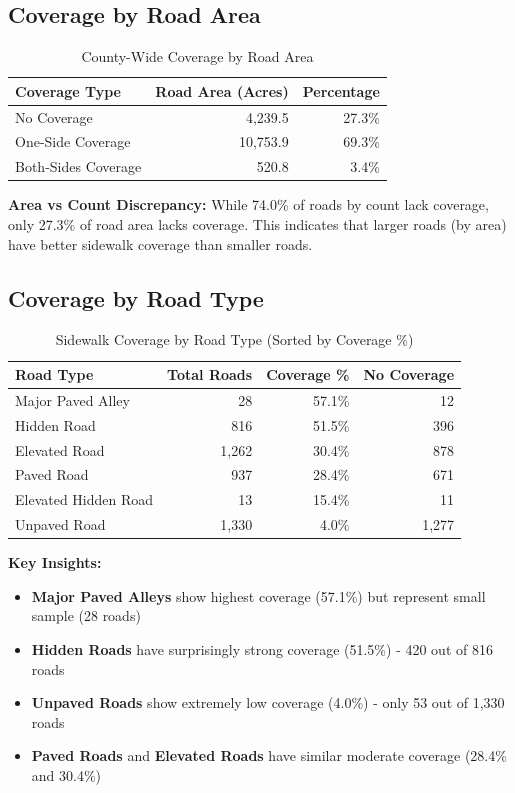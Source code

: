 \documentclass[11pt,letterpaper]{article}
\begin{document}
\subsection{Coverage by Road Area}

\begin{table}[H]
\centering
\begin{tabular}{@{}lrr@{}}
\toprule
\textbf{Coverage Type} & \textbf{Road Area (Acres)} & \textbf{Percentage} \\
\midrule
No Coverage & 4,239.5 & 27.3\% \\
One-Side Coverage & 10,753.9 & 69.3\% \\
Both-Sides Coverage & 520.8 & 3.4\% \\
\bottomrule
\end{tabular}
\caption{County-Wide Coverage by Road Area}
\end{table}

\textbf{Area vs Count Discrepancy:} While 74.0\% of roads by count lack coverage, only 27.3\% of road area lacks coverage. This indicates that larger roads (by area) have better sidewalk coverage than smaller roads.

\subsection{Coverage by Road Type}

\begin{table}[H]
\centering
\begin{tabular}{@{}lrrr@{}}
\toprule
\textbf{Road Type} & \textbf{Total Roads} & \textbf{Coverage \%} & \textbf{No Coverage} \\
\midrule
Major Paved Alley & 28 & 57.1\% & 12 \\
Hidden Road & 816 & 51.5\% & 396 \\
Elevated Road & 1,262 & 30.4\% & 878 \\
Paved Road & 937 & 28.4\% & 671 \\
Elevated Hidden Road & 13 & 15.4\% & 11 \\
Unpaved Road & 1,330 & 4.0\% & 1,277 \\
\bottomrule
\end{tabular}
\caption{Sidewalk Coverage by Road Type (Sorted by Coverage \%)}
\end{table}

\textbf{Key Insights:}
\begin{itemize}
    \item \textbf{Major Paved Alleys} show highest coverage (57.1\%) but represent small sample (28 roads)
    \item \textbf{Hidden Roads} have surprisingly strong coverage (51.5\%) - 420 out of 816 roads
    \item \textbf{Unpaved Roads} show extremely low coverage (4.0\%) - only 53 out of 1,330 roads
    \item \textbf{Paved Roads} and \textbf{Elevated Roads} have similar moderate coverage (28.4\% and 30.4\%)
\end{itemize}
\end{document}
